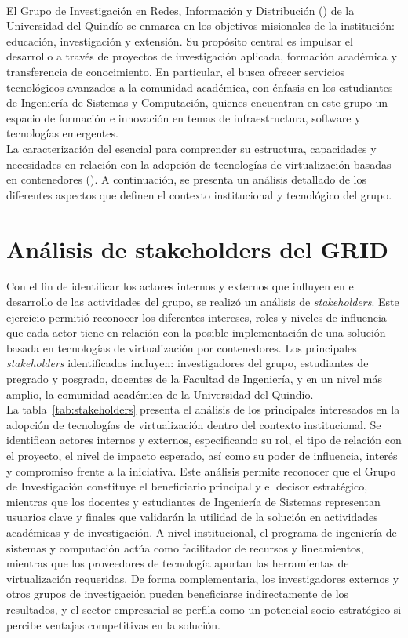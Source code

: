 \label{cap:caracterizacionGRID}
\mbox{}\\
El Grupo de Investigación en Redes, Información y Distribución (\GRID) de la Universidad del Quindío se enmarca en los objetivos misionales de la institución: educación, investigación y extensión. Su propósito central es impulsar el desarrollo a través de proyectos de investigación aplicada, formación académica y transferencia de conocimiento. En particular, el \GRID busca ofrecer servicios tecnológicos avanzados a la comunidad académica, con énfasis en los estudiantes de Ingeniería de Sistemas y Computación, quienes encuentran en este grupo un espacio de formación e innovación en temas de infraestructura, software y tecnologías emergentes.\\
La caracterización del \GRID\@resulta esencial para comprender su estructura, capacidades y necesidades en relación con la adopción de tecnologías de virtualización basadas en contenedores (\VBC). A continuación, se presenta un análisis detallado de los diferentes aspectos que definen el contexto institucional y tecnológico del grupo.

\section{Análisis de stakeholders del GRID}
Con el fin de identificar los actores internos y externos que influyen en el desarrollo de las actividades del grupo, se realizó un análisis de \textit{stakeholders}. Este ejercicio permitió reconocer los diferentes intereses, roles y niveles de influencia que cada actor tiene en relación con la posible implementación de una solución basada en tecnologías de virtualización por contenedores. Los principales \textit{stakeholders} identificados incluyen: investigadores del grupo, estudiantes de pregrado y posgrado, docentes de la Facultad de Ingeniería, y en un nivel más amplio, la comunidad académica de la Universidad del Quindío.\\
La tabla~\ref{tab:stakeholders} presenta el análisis de los principales interesados en la adopción de tecnologías de virtualización dentro del contexto institucional. Se identifican actores internos y externos, especificando su rol, el tipo de relación con el proyecto, el nivel de impacto esperado, así como su poder de influencia, interés y compromiso frente a la iniciativa. Este análisis permite reconocer que el Grupo de Investigación \GRID constituye el beneficiario principal y el decisor estratégico, mientras que los docentes y estudiantes de Ingeniería de Sistemas representan usuarios clave y finales que validarán la utilidad de la solución en actividades académicas y de investigación. A nivel institucional, el programa de ingeniería de sistemas y computación actúa como facilitador de recursos y lineamientos, mientras que los proveedores de tecnología aportan las herramientas de virtualización requeridas. De forma complementaria, los investigadores externos y otros grupos de investigación pueden beneficiarse indirectamente de los resultados, y el sector empresarial se perfila como un potencial socio estratégico si percibe ventajas competitivas en la solución.



